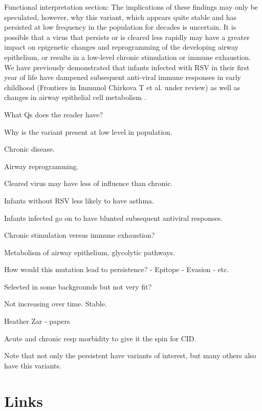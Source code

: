 \documentclass{article}
\begin{document}
Functional interpretation section:
The implications of these findings may only be speculated, however, why this variant, which appears quite stable and has persisted at low frequency in the population for decades is uncertain. It is possible that a virus that persists or is cleared less rapidly may have a greater impact on epigenetic changes and reprogramming of the developing airway epithelium, or results in a low-level chronic stimulation or immune exhaustion. We have previously demonstrated that infants infected with RSV in their first year of life have dampened subsequent anti-viral immune responses in early childhood (Frontiers in Immunol Chirkova T et al. under review) as well as changes in airway epithelial cell metabolism \cite{connelly2021metabolic}.
\begin{description}[noitemsep]
\item What Qs does the reader have?
\item Why is the variant present at low level in population. 
\item Chronic disease.
\item Airway reprogramming.
\item Cleared virus may have less of influence than chronic.
\item Infants without RSV less likely to have asthma.
\item Infants infected go on to have blunted subsequent antiviral responses.
\item Chronic stimulation versus immune exhaustion?
\item Metabolism of airway epithelium, glycolytic pathways.
\item How would this mutation lead to persistence? 
	- Epitope
	- Evasion
	- etc.
\item Selected in some backgrounds but not very fit?
\item Not increasing over time. Stable.
\item Heather Zar - papers
\item Acute and chronic resp morbidity to give it the spin for CID.
	\item Note that not only the persistent have variants of interest, but many others also have this variants. 
\end{description}

\section{Links}
\end{document}
